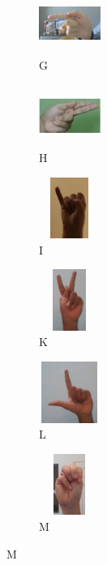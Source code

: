 \begin{figure}[H]
  \begin{subfigure}{0.1\textwidth}
    \includegraphics[width=2cm, height=2cm, keepaspectratio=false]{images/7-anexe/g_ex1.jpg}
    \caption{G}
  \end{subfigure}\hspace{1cm}
  \begin{subfigure}{0.1\textwidth}
    \includegraphics[width=2cm, height=2cm, keepaspectratio=false]{images/7-anexe/h_ex1.jpg}
    \caption{H}
  \end{subfigure}\hspace{1cm}
  \begin{subfigure}{0.1\textwidth}
    \includegraphics[width=2cm, height=2cm, keepaspectratio=false]{images/7-anexe/i_ex1.jpg}
    \caption{I}
  \end{subfigure}\hspace{1cm}
    
    \begin{subfigure}{0.1\textwidth}
    \includegraphics[width=2cm, height=2cm, keepaspectratio=false]{images/7-anexe/k_ex1.jpg}
    \caption{K}
  \end{subfigure}\hspace{1cm}
  \begin{subfigure}{0.1\textwidth}
    \includegraphics[width=2cm, height=2cm, keepaspectratio=false]{images/7-anexe/l_ex1.jpg}
    \caption{L}
  \end{subfigure}\hspace{1cm}
  \begin{subfigure}{0.1\textwidth}
    \includegraphics[width=2cm, height=2cm, keepaspectratio=false]{images/7-anexe/m_ex1.jpg}
    \caption{M}
  \end{subfigure}\hspace{1cm}


\end{figure}

